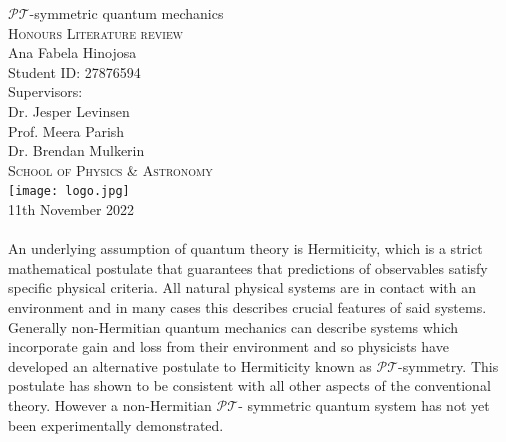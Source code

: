 \documentclass[12pt, a4paper]{report}
\newcommand\PT{\(\mathcal{PT}\)}
\begin{document}
  \begin{center}
  \vspace{2cm}
  {\Huge \( \mathcal{PT} \)-symmetric quantum mechanics}\\
  \vspace{0.5cm}
  \textsc{Honours Literature review}\\
  \vspace{1cm}
  {\Large Ana Fabela Hinojosa\\Student ID: 27876594}\\
  \vspace{0.5cm}
  {\Large Supervisors:\\ Dr. Jesper Levinsen \\ Prof. Meera Parish\\\vspace{0.2cm}Dr. Brendan Mulkerin}\\
  \vspace{0.5cm}
  \textsc{School of Physics \& Astronomy}\\
  \vspace{0.5cm}
  \texttt{[image: logo.jpg]} \\ %
  {11th November 2022}\\
  \vspace{3cm}
 \\An underlying assumption of quantum theory is Hermiticity, which is a strict mathematical postulate that guarantees that predictions of observables satisfy specific physical criteria. All natural physical systems are in contact with an environment and in many cases this describes crucial features of said systems. Generally non-Hermitian quantum mechanics can describe systems which incorporate gain and loss from their environment and so physicists have developed an alternative postulate to Hermiticity known as \PT-symmetry. This postulate has shown to be consistent with all other aspects of the conventional theory. However a non-Hermitian \PT- symmetric quantum system has not yet been experimentally demonstrated.
  \end{center}


\tableofcontents

\end{document}
